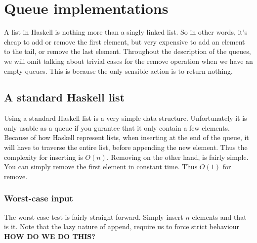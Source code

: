 \section*{Queue implementations}
A list in Haskell is nothing more than a singly linked list. So in other words, it's cheap to add or remove the first element, but very expensive to add an element to the tail, or remove the last element. Throughout the description of the queues, we will omit talking about trivial cases for the remove operation when we have an empty queues. This is because the only sensible action is to return nothing.

\subsection*{A standard Haskell list}
Using a standard Haskell list is a very simple data structure. Unfortunately it is only usable as a queue if you gurantee that it only contain a few elements. Because of how Haskell represent lists, when inserting at the end of the queue, it will have to traverse the entire list, before appending the new element. Thus the complexity for inserting is $O(n)$. Removing on the other hand, is fairly simple. You can simply remove the first element in constant time. Thus $O(1)$ for remove.

\subsubsection{Worst-case input}
The worst-case test is fairly straight forward. Simply insert $n$ elements and that is it. Note that the lazy nature of append, require us to force strict behaviour \textbf{HOW DO WE DO THIS?}

